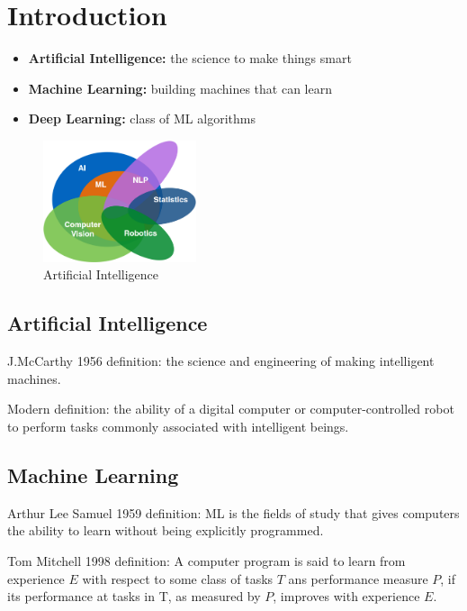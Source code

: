 \section{Introduction}

\begin{itemize}
    \item \textbf{Artificial Intelligence:} the science to make things smart
    \item \textbf{Machine Learning:} building machines that can learn
    \item \textbf{Deep Learning:} class of ML algorithms
\end{itemize}
\begin{figure}[h]
    \centering
    \includegraphics[width=0.4\textwidth]{images/AI.png}
    \caption{Artificial Intelligence}
\end{figure}

\subsection{Artificial Intelligence}
\begin{mdframed}
    J.McCarthy 1956 definition: the science and engineering of making intelligent machines.
\end{mdframed}
\begin{mdframed}
    Modern definition: the ability of a digital computer or computer-controlled robot to perform tasks commonly associated with intelligent beings.
\end{mdframed}

\subsection{Machine Learning}
\begin{mdframed}
    Arthur Lee Samuel 1959 definition: ML is the fields of study that gives computers the ability to learn without being explicitly programmed.
\end{mdframed}
\begin{mdframed}
    Tom Mitchell 1998 definition: A computer program is said to learn from experience $E$ with respect to some class of tasks $T$ ans performance measure $P$, if its performance at tasks in T, as measured by $P$, improves with experience $E$.
\end{mdframed}

